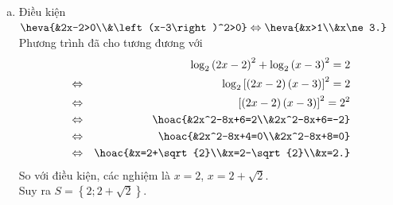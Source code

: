 \begin{baitap}
{\begin{enumerate}[a)]
\begin{eqnarray*}
				&\Leftrightarrow& \log_2(x+1)=\log_22 \cdot (x-1)\\
				&\Leftrightarrow& x+1=2x-2\\
				&\Leftrightarrow& x=3.
			\end{eqnarray*}
			\item Điều kiện $\heva{&2x-2>0\\&\left(x-3\right)^2>0} \Leftrightarrow \heva{&x>1\\&x\ne 3.}$\\
			Phương trình đã cho tương đương với
			\begin{eqnarray*}
				&  &\log_{2}\left(2x-2\right)^2+\log_{2}\left(x-3\right)^2=2\\
				& \Leftrightarrow & \log_{2}\left[\left(2x-2\right)\left(x-3\right)\right]^2=2\\ & \Leftrightarrow & \left[\left(2x-2\right)\left(x-3\right)\right]^2=2^2\\
				& \Leftrightarrow & \hoac{&2x^2-8x+6=2\\&2x^2-8x+6=-2}\\
				& \Leftrightarrow & \hoac{&2x^2-8x+4=0\\&2x^2-8x+8=0}\\
				& \Leftrightarrow & \hoac{&x=2+\sqrt{2}\\&x=2-\sqrt{2}\\&x=2.}
			\end{eqnarray*}
			So với điều kiện, các nghiệm là $x=2$, $x=2+\sqrt{2}$.\\
			Suy ra  $S=\left\lbrace 2;2+\sqrt{2}\right\rbrace$.
	\end{enumerate}}
\end{baitap}

